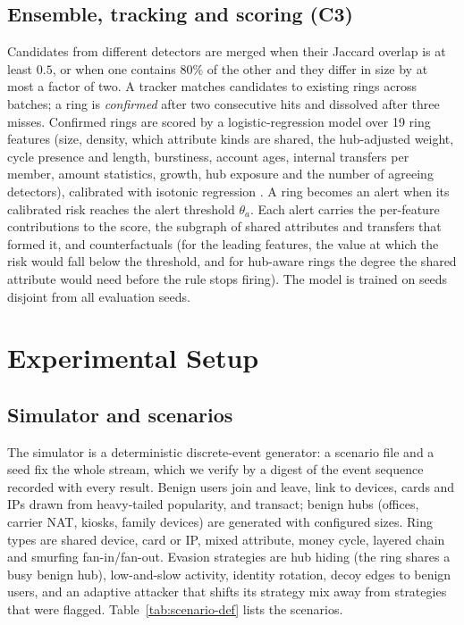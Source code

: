 \subsection{Ensemble, tracking and scoring (C3)}
Candidates from different detectors are merged when their Jaccard overlap is at
least $0.5$, or when one contains $80\%$ of the other and they differ in size by
at most a factor of two. A tracker matches candidates to existing rings across
batches; a ring is \emph{confirmed} after two consecutive hits and dissolved
after three misses. Confirmed rings are scored by a logistic-regression model
over 19 ring features (size, density, which attribute kinds are shared, the
hub-adjusted weight, cycle presence and length, burstiness, account ages,
internal transfers per member, amount statistics, growth, hub exposure and
the number of agreeing detectors), calibrated with isotonic regression
\cite{azbergen2026calibration}. A ring becomes an alert when its calibrated risk
reaches the alert threshold $\theta_a$. Each alert carries the per-feature
contributions to the score, the subgraph of shared attributes and transfers
that formed it, and counterfactuals (for the leading features, the value at which
the risk would fall below the threshold, and for hub-aware rings the degree the
shared attribute would need before the rule stops firing). The model is trained on
seeds disjoint from all evaluation seeds.

\section{Experimental Setup}
\label{sec:setup}
\subsection{Simulator and scenarios}
The simulator is a deterministic discrete-event generator: a scenario file and
a seed fix the whole stream, which we verify by a digest of the event sequence
recorded with every result. Benign users join and leave, link to devices, cards
and IPs drawn from heavy-tailed popularity, and transact; benign hubs (offices,
carrier NAT, kiosks, family devices) are generated with configured sizes. Ring
types are shared device, card or IP, mixed attribute, money cycle, layered
chain and smurfing fan-in/fan-out. Evasion strategies are hub hiding (the ring
shares a busy benign hub), low-and-slow activity, identity rotation, decoy edges
to benign users, and an adaptive attacker that shifts its strategy mix away
from strategies that were flagged.
Table~\ref{tab:scenario-def} lists the scenarios.

